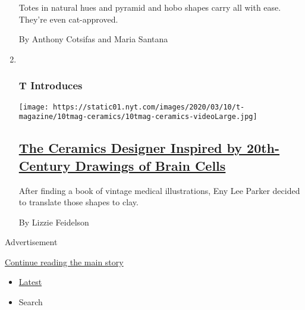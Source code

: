\begin{enumerate}
  Totes in natural hues and pyramid and hobo shapes carry all with ease.
  They're even cat-approved.

  By Anthony Cotsifas and Maria Santana
\item ~
  \hypertarget{t-introduces}{%
  \subsubsection{T Introduces}\label{t-introduces}}

  \texttt{[image: https://static01.nyt.com/images/2020/03/10/t-magazine/10tmag-ceramics/10tmag-ceramics-videoLarge.jpg]}

  \hypertarget{the-ceramics-designer-inspired-by-20th-century-drawings-of-brain-cells}{%
  \subsection{\texorpdfstring{\href{/2020/03/10/t-magazine/eny-lee-parker.html}{The
  Ceramics Designer Inspired by 20th-Century Drawings of Brain
  Cells}}{The Ceramics Designer Inspired by 20th-Century Drawings of Brain Cells}}\label{the-ceramics-designer-inspired-by-20th-century-drawings-of-brain-cells}}

  After finding a book of vintage medical illustrations, Eny Lee Parker
  decided to translate those shapes to clay.

  By Lizzie Feidelson
\end{enumerate}

Advertisement

\protect\hyperlink{after-mid1}{Continue reading the main story}

\begin{itemize}
\tightlist
\item
  \protect\hyperlink{stream-panel}{Latest}
\item
  Search
\end{itemize}

